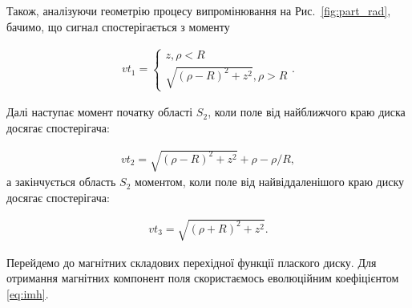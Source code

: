 Також, аналізуючи геометрію процесу випромінювання на 
Рис.~\ref{fig:part_rad}, бачимо, що сигнал спостерігається з моменту 

\begin{equation} \begin{aligned} \label{eq:time1}
vt_1 = \begin{cases}
z, \rho < R \\
\sqrt{(\rho-R)^2+z^2}, \rho > R
\end{cases}.
\end{aligned} \end{equation}

Далі наступає момент початку області $ S_2 $, коли поле від найближчого 
краю диска досягає спостерігача:

\begin{equation} \begin{aligned} \label{eq:time2}
vt_2 = \sqrt{(\rho-R)^2+z^2} + \rho - \rho / R,
\end{aligned} \end{equation}
%
а закінчується область $ S_2 $ моментом, коли поле від найвіддаленішого 
краю диску досягає спостерігача:

\begin{equation} \begin{aligned} \label{eq:time3}
vt_3 = \sqrt{(\rho+R)^2+z^2}.
\end{aligned} \end{equation}

Перейдемо до магнітних складових перехідної функції плаского диску. Для 
отримання магнітних компонент поля скористаємось еволюційним коефіцієнтом 
\eqref{eq:imh}.


